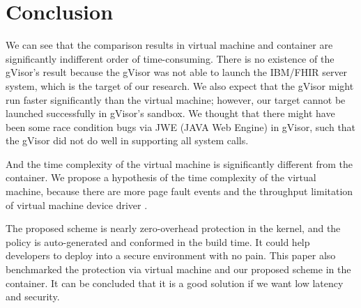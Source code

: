 \section{Conclusion}

We can see that the comparison results in virtual machine and container are
significantly indifferent order of time-consuming. There is no existence
of the gVisor's result because the gVisor was not able to launch the
IBM/FHIR server system, which is the target of our research.
We also expect that the gVisor might run faster significantly than the virtual
machine; however, our target cannot be launched successfully in
gVisor's sandbox.
We thought that there might have been some race condition bugs via JWE (JAVA Web
Engine) in gVisor, such that the gVisor did not do well in supporting all system calls.

And the time complexity of the virtual machine is significantly different from
the container. We propose a hypothesis of the time complexity of the virtual
machine, because there are more page fault events and the throughput limitation
of virtual machine device driver \cite{10.5555/1267569.1267570,7095802}.

The proposed scheme is nearly zero-overhead protection in the kernel, and
the policy is auto-generated and conformed in the build time. It could help
developers to deploy into a secure environment with no pain. This paper also
benchmarked the protection via virtual machine and our proposed scheme in
the container. It can be concluded that it is a good solution if we want
low latency and security.


